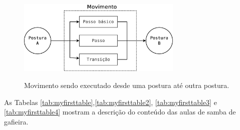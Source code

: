 \documentclass[12pt, a4paper]{article}
\begin{document}
\begin{figure}[h]
  \centering
  \caption{ Movimento sendo executado desde uma postura até outra postura.}
  \includegraphics[width=0.7\textwidth]{Diagrama1.eps}%
  \label{fig:mov}
\end{figure}



As Tabelas \ref{tab:myfirsttable},\ref{tab:myfirsttable2}, \ref{tab:myfirsttable3} e \ref{tab:myfirsttable4} 
mostram a descrição do conteúdo das aulas de samba de gafieira.
\end{document}
